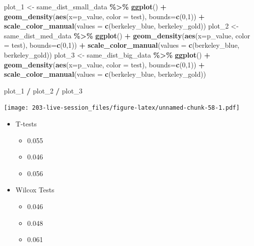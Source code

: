 \documentclass[
]{book}
\newenvironment{Shaded}{\begin{snugshade}}{\end{snugshade}}
\newcommand{\AttributeTok}[1]{\textcolor[rgb]{0.13,0.29,0.53}{#1}}
\newcommand{\DecValTok}[1]{\textcolor[rgb]{0.00,0.00,0.81}{#1}}
\newcommand{\FunctionTok}[1]{\textcolor[rgb]{0.13,0.29,0.53}{\textbf{#1}}}
\newcommand{\NormalTok}[1]{#1}
\newcommand{\OtherTok}[1]{\textcolor[rgb]{0.56,0.35,0.01}{#1}}
\newcommand{\SpecialCharTok}[1]{\textcolor[rgb]{0.81,0.36,0.00}{\textbf{#1}}}
\providecommand{\tightlist}{%
  \setlength{\itemsep}{0pt}\setlength{\parskip}{0pt}}
\theoremstyle{definition}
\theoremstyle{definition}
\theoremstyle{definition}
\theoremstyle{definition}
\theoremstyle{remark}
\begin{document}
\begin{Shaded}
\begin{Highlighting}[]
\NormalTok{plot\_1 }\OtherTok{\textless{}{-}}\NormalTok{ same\_dist\_small\_data }\SpecialCharTok{\%\textgreater{}\%}
  \FunctionTok{ggplot}\NormalTok{() }\SpecialCharTok{+}
  \FunctionTok{geom\_density}\NormalTok{(}\FunctionTok{aes}\NormalTok{(}\AttributeTok{x=}\NormalTok{p\_value, }\AttributeTok{color =}\NormalTok{ test), }\AttributeTok{bounds=}\FunctionTok{c}\NormalTok{(}\DecValTok{0}\NormalTok{,}\DecValTok{1}\NormalTok{)) }\SpecialCharTok{+}
  \FunctionTok{scale\_color\_manual}\NormalTok{(}\AttributeTok{values =} \FunctionTok{c}\NormalTok{(berkeley\_blue, berkeley\_gold))}
\NormalTok{plot\_2 }\OtherTok{\textless{}{-}}\NormalTok{ same\_dist\_med\_data }\SpecialCharTok{\%\textgreater{}\%}
  \FunctionTok{ggplot}\NormalTok{() }\SpecialCharTok{+}
  \FunctionTok{geom\_density}\NormalTok{(}\FunctionTok{aes}\NormalTok{(}\AttributeTok{x=}\NormalTok{p\_value, }\AttributeTok{color =}\NormalTok{ test), }\AttributeTok{bounds=}\FunctionTok{c}\NormalTok{(}\DecValTok{0}\NormalTok{,}\DecValTok{1}\NormalTok{)) }\SpecialCharTok{+}
  \FunctionTok{scale\_color\_manual}\NormalTok{(}\AttributeTok{values =} \FunctionTok{c}\NormalTok{(berkeley\_blue, berkeley\_gold))}
\NormalTok{plot\_3 }\OtherTok{\textless{}{-}}\NormalTok{ same\_dist\_big\_data }\SpecialCharTok{\%\textgreater{}\%}
  \FunctionTok{ggplot}\NormalTok{() }\SpecialCharTok{+}
  \FunctionTok{geom\_density}\NormalTok{(}\FunctionTok{aes}\NormalTok{(}\AttributeTok{x=}\NormalTok{p\_value, }\AttributeTok{color =}\NormalTok{ test), }\AttributeTok{bounds=}\FunctionTok{c}\NormalTok{(}\DecValTok{0}\NormalTok{,}\DecValTok{1}\NormalTok{)) }\SpecialCharTok{+}
  \FunctionTok{scale\_color\_manual}\NormalTok{(}\AttributeTok{values =} \FunctionTok{c}\NormalTok{(berkeley\_blue, berkeley\_gold))}

\NormalTok{plot\_1 }\SpecialCharTok{/}\NormalTok{ plot\_2 }\SpecialCharTok{/}\NormalTok{ plot\_3}
\end{Highlighting}
\end{Shaded}

\texttt{[image: 203-live-session\_files/figure-latex/unnamed-chunk-58-1.pdf]}

\begin{itemize}
\tightlist
\item
  T-tests

  \begin{itemize}
  \tightlist
  \item
    0.055
  \item
    0.046
  \item
    0.056
  \end{itemize}
\item
  Wilcox Tests

  \begin{itemize}
  \tightlist
  \item
    0.046
  \item
    0.048
  \item
    0.061
  \end{itemize}
\end{itemize}
\end{document}
